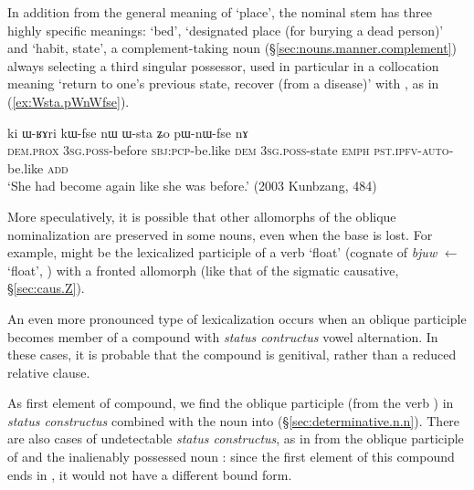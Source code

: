 In addition from the general meaning of `place', the nominal stem  has three highly specific meanings:  `bed',  `designated place (for burying a dead person)' and  `habit, state', a complement-taking noun (§\ref{sec:nouns.manner.complement}) always selecting a third singular possessor, used in particular in a collocation meaning `return to one's previous state, recover (from a disease)' with , as in (\ref{ex:Wsta.pWnWfse}).

\begin{exe}
\ex \label{ex:Wsta.pWnWfse}
\gll  ki ɯ-ʁɤri kɯ-fse nɯ ɯ-sta ʑo pɯ-nɯ-fse nɤ \\
\textsc{dem}.\textsc{prox} \textsc{3sg}.\textsc{poss}-before \textsc{sbj}:\textsc{pcp}-be.like \textsc{dem} \textsc{3sg}.\textsc{poss}-state \textsc{emph} \textsc{pst}.\textsc{ipfv}-\textsc{auto}-be.like \textsc{add} \\
\glt  `She had become again like she was before.' (2003 Kunbzang, 484)
 \end{exe}

 


More speculatively, it is possible that other allomorphs of the oblique nominalization are preserved in some nouns, even when the base is lost. For example,  might be the lexicalized participle of a verb  `float' (cognate of  \textit{bjuw} $\leftarrow$  `float', \citealt{zhangsy19cognates}) with a fronted  allomorph (like that of the sigmatic causative, §\ref{sec:caus.Z}).

An even more pronounced type of lexicalization occurs when an oblique participle becomes member of a compound with \textit{status contructus} vowel alternation. In these cases, it is probable that the compound is genitival, rather than a reduced relative clause.

As first element of compound, we find the oblique participle  (from the verb ) in \textit{status constructus} combined with the noun  into 
 (§\ref{sec:determinative.n.n}). There are also cases of undetectable \textit{status constructus}, as in  from the oblique participle of  and the inalienably possessed noun : since the first element of this compound  ends in , it would not have a different bound form.

